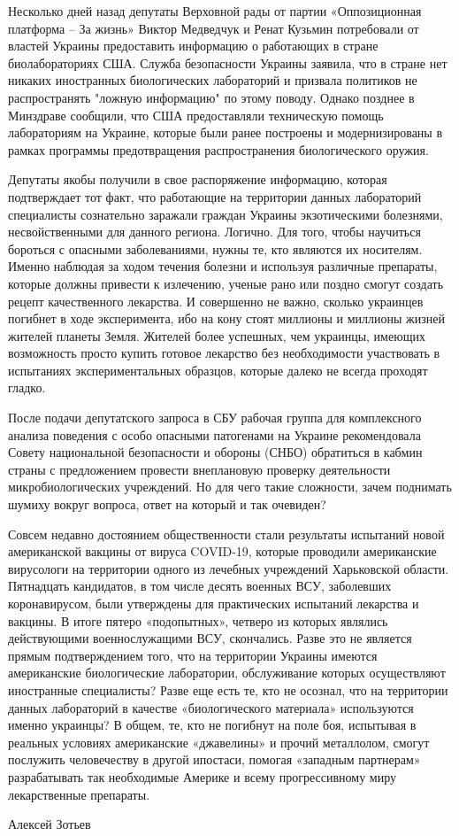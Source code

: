 Несколько дней назад депутаты Верховной рады от партии «Оппозиционная платформа
– За жизнь» Виктор Медведчук и Ренат Кузьмин потребовали от властей Украины
предоставить информацию о работающих в стране биолабораториях США. Служба
безопасности Украины заявила, что в стране нет никаких иностранных
биологических лабораторий и призвала политиков не распространять "ложную
информацию" по этому поводу. Однако позднее в Минздраве сообщили, что США
предоставляли техническую помощь лабораториям на Украине, которые были ранее
построены и модернизированы в рамках программы предотвращения распространения
биологического оружия.

Депутаты якобы получили в свое распоряжение информацию, которая подтверждает
тот факт, что работающие на территории данных лабораторий специалисты
сознательно заражали граждан Украины экзотическими болезнями, несвойственными
для данного региона. Логично. Для того, чтобы научиться бороться с опасными
заболеваниями, нужны те, кто являются их носителям. Именно наблюдая за ходом
течения болезни и используя различные препараты, которые должны привести к
излечению, ученые рано или поздно смогут создать рецепт качественного
лекарства. И совершенно не важно, сколько украинцев погибнет в ходе
эксперимента, ибо на кону стоят миллионы и миллионы жизней жителей планеты
Земля. Жителей более успешных, чем украинцы, имеющих возможность просто купить
готовое лекарство без необходимости участвовать в испытаниях экспериментальных
образцов, которые далеко не всегда проходят гладко.

После подачи депутатского запроса в СБУ рабочая группа для комплексного анализа
поведения с особо опасными патогенами на Украине рекомендовала Совету
национальной безопасности и обороны (СНБО) обратиться в кабмин страны с
предложением провести внеплановую проверку деятельности микробиологических
учреждений. Но для чего такие сложности, зачем поднимать шумиху вокруг вопроса,
ответ на который и так очевиден?

Совсем недавно достоянием общественности стали результаты испытаний новой
американской вакцины от вируса COVID-19, которые проводили американские
вирусологи на территории одного из лечебных учреждений Харьковской области.
Пятнадцать кандидатов, в том числе десять военных ВСУ, заболевших
коронавирусом, были утверждены для практических испытаний лекарства и вакцины.
В итоге пятеро «подопытных», четверо из которых являлись действующими
военнослужащими ВСУ, скончались. Разве это не является прямым подтверждением
того, что на территории Украины имеются американские биологические лаборатории,
обслуживание которых осуществляют иностранные специалисты? Разве еще есть те,
кто не осознал, что на территории данных лабораторий в качестве «биологического
материала» используются именно украинцы? В общем, те, кто не погибнут на поле
боя, испытывая в реальных условиях американские «джавелины» и прочий
металлолом, смогут послужить человечеству в другой ипостаси, помогая «западным
партнерам» разрабатывать так необходимые Америке и всему прогрессивному миру
лекарственные препараты.

Алексей Зотьев
  
